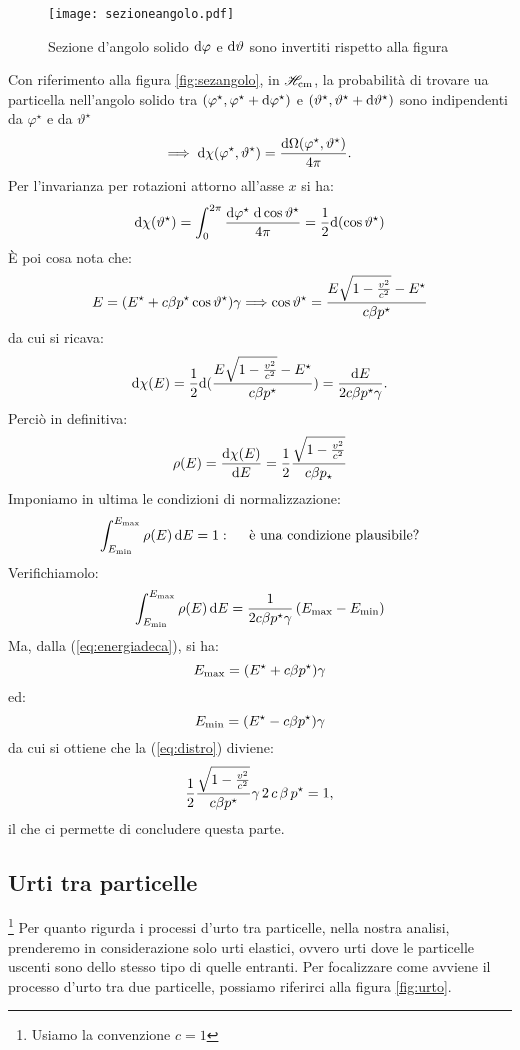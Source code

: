 \begin{figure}[htbp]
\begin{center}
\texttt{[image: sezioneangolo.pdf]}
\caption{Sezione d'angolo solido \(\mathrm{d} \varphi\) e \(\mathrm{d} \vartheta\)
 sono invertiti rispetto alla figura} \label{fig:sezangolo}
\end{center}
\end{figure}

Con riferimento alla figura \vref{fig:sezangolo}, in $\mathscr{H}_{\mathrm{cm}}$, la
probabilit\`a di trovare ua particella nell'angolo solido tra
$(\varphi^{\star},\varphi^{\star}+\mathrm{d} \varphi^{\star})$ e
$(\vartheta^{\star},\vartheta^{\star}+\mathrm{d} \vartheta^{\star})$ sono
indipendenti da $\varphi^{\star}$ e da $\vartheta^{\star}$
$$
\Longrightarrow \; \mathrm{d} \chi
(\varphi^{\star},\vartheta^{\star})=\frac{\mathrm{d}
\Omega(\varphi^{\star},\vartheta^{\star})}{4 \pi}.
$$
Per l'invarianza per rotazioni attorno all'asse $x$ si ha:
$$
\mathrm{d} \chi (\vartheta^{\star})=\int_{0}^{2 \pi}\frac{\mathrm{d}
\varphi^{\star} \;\mathrm{d} \cos \vartheta^{\star}}{4 \pi}=\frac{1}{2}
\mathrm{d} (\cos \vartheta^{\star})
$$
\`E poi cosa nota che:
\begin{equation}
E=(E^{\star}+c\beta p^{\star}\cos\vartheta^{\star})\gamma
\Longrightarrow \cos\vartheta^{\star}=\frac{E \sqrt{1-\frac{v^{2}}{c^{2}}}
-E^{\star}}{c\beta p^{\star}} \label{eq:energiadeca}\end{equation}
da cui si ricava:
$$
\mathrm{d} \chi (E)=\frac{1}{2} \mathrm{d} (\frac{E \sqrt{1-\frac{v^{2}}{c^{2}}} -E^{\star}}{c\beta
p^{\star}})=\frac{\mathrm{d} E}{2 c \beta p^{\star}\gamma}.
$$
Perci\`o in definitiva:
$$
\rho (E)=\frac{\mathrm{d} \chi (E)}{\mathrm{d} E}=\frac{1}{2}\frac{\sqrt{1-\frac{v^{2}}{c^{2}}}}{c \beta
p_{\star}}
$$
Imponiamo in ultima le condizioni di normalizzazione:
$$
\int_{E_{\mathrm{min}}}^{E_{\mathrm{max}}} \rho (E)\,\mathrm{d} E=1:
\quad\mbox{ \`e una condizione plausibile?}
$$
Verifichiamolo:
\begin{equation}
\int_{E_{\mathrm{min}}}^{E_{\mathrm{max}}} \rho (E)\,\mathrm{d} E = \frac{1}{2 c
 \beta  p^{\star}\gamma}\,(E_{\mathrm{max}}-E_{\mathrm{min}})
\label{eq:distro}
\end{equation}
Ma, dalla (\ref{eq:energiadeca}), si ha:
$$
E_{\mathrm{max}}=(E^{\star}+c\beta p^{\star})\gamma
$$
ed:
$$
E_{\mathrm{min}}=(E^{\star}-c\beta p^{\star})\gamma
$$
da cui si ottiene che la (\ref{eq:distro}) diviene:
$$
\frac{1}{2}\frac{\sqrt{1-\frac{v^{2}}{c^{2}}}}{c\beta p^{\star}}\gamma \,2 \,c \,\beta\,
p^{\star}=1,
$$
il che ci permette di concludere questa parte.
\subsection{ Urti tra particelle}
\footnote{ Usiamo la convenzione $c=1$} Per quanto rigurda i
processi d'urto tra particelle, nella nostra analisi, prenderemo
in considerazione solo urti elastici, ovvero urti dove le
particelle uscenti sono dello stesso tipo di quelle entranti. Per
focalizzare come avviene il processo d'urto tra due particelle,
possiamo riferirci alla figura \vref{fig:urto}.


